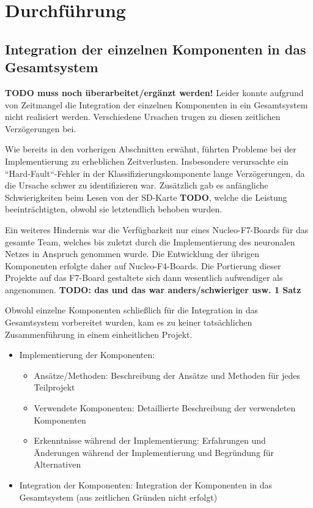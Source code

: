 \newpage
\section{Durchführung}






\subsection{Integration der einzelnen Komponenten in das Gesamtsystem}

\textbf{TODO muss noch überarbeitet/ergänzt werden!}
Leider konnte aufgrund von Zeitmangel die Integration der einzelnen Komponenten in ein Gesamtsystem nicht realisiert werden. Verschiedene Ursachen trugen zu diesen zeitlichen Verzögerungen bei.

Wie bereits in den vorherigen Abschnitten erwähnt, führten Probleme bei der Implementierung zu erheblichen Zeitverlusten. Insbesondere verursachte ein ``Hard-Fault``-Fehler in der Klassifizierungskomponente lange Verzögerungen, da die Ursache schwer zu identifizieren war. Zusätzlich gab es anfängliche Schwierigkeiten beim Lesen von der SD-Karte \textbf{TODO}, welche die Leistung beeinträchtigten, obwohl sie letztendlich behoben wurden.

Ein weiteres Hindernis war die Verfügbarkeit nur eines Nucleo-F7-Boards für das gesamte Team, welches bis zuletzt durch die Implementierung des neuronalen Netzes in Anspruch genommen wurde. Die Entwicklung der übrigen Komponenten erfolgte daher auf Nucleo-F4-Boards. Die Portierung dieser Projekte auf das F7-Board gestaltete sich dann wesentlich aufwendiger als angenommen. \textbf{TODO: das und das war anders/schwieriger usw. 1 Satz}

Obwohl einzelne Komponenten schließlich für die Integration in das Gesamtsystem vorbereitet wurden, kam es zu keiner tatsächlichen Zusammenführung in einem einheitlichen Projekt.


\begin{itemize}

	\item Implementierung der Komponenten:
	\begin{itemize}
		\item Ansätze/Methoden: Beschreibung der Ansätze und Methoden für jedes Teilprojekt
		\item Verwendete Komponenten: Detaillierte Beschreibung der verwendeten Komponenten
		\item Erkenntnisse während der Implementierung: Erfahrungen und Änderungen während der Implementierung und Begründung für Alternativen
	\end{itemize}
	\item Integration der Komponenten: Integration der Komponenten in das Gesamtsystem (aus zeitlichen Gründen nicht erfolgt)
\end{itemize}


